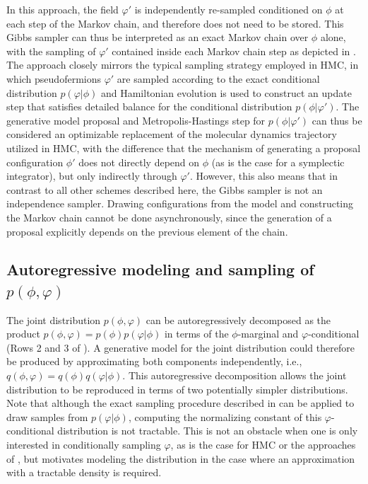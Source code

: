 \documentclass[aps,prd,twocolumn,nofootinbib,superscriptaddress,preprintnumbers]{revtex4-1}
\begin{document}
In this approach, the field $\varphi'$ is independently re-sampled conditioned on $\phi$ at each step of the Markov chain, and therefore does not need to be stored. This Gibbs sampler can thus be interpreted as an exact Markov chain over $\phi$ alone, with the sampling of $\varphi'$ contained inside each Markov chain step as depicted in . The approach closely mirrors the typical sampling strategy employed in HMC, in which pseudofermions $\varphi'$ are sampled according to the exact conditional distribution $p(\varphi|\phi)$ and Hamiltonian evolution is used to construct an update step that satisfies detailed balance for the conditional distribution $p(\phi|\varphi')$. The generative model proposal and Metropolis-Hastings step for $p(\phi|\varphi')$ can thus be considered an optimizable replacement of the molecular dynamics trajectory utilized in HMC, with the difference that the mechanism of generating a proposal configuration $\phi'$ does not directly depend on $\phi$ (as is the case for a symplectic integrator), but only indirectly through $\varphi'$. However, this also means that in contrast to all other schemes described here, the Gibbs sampler is not an independence sampler. Drawing configurations from the model and constructing the Markov chain cannot be done asynchronously, since the generation of a proposal explicitly depends on the previous element of the chain.


\subsection{Autoregressive modeling and sampling of \texorpdfstring{$p(\phi,\varphi)$}{p(phi,varphi)}}
\label{sec:autoregressive-sampling}

The joint distribution $p(\phi,\varphi)$ can be autoregressively decomposed as the product $p(\phi,\varphi) = p(\phi) p(\varphi|\phi)$ in terms of the $\phi$-marginal and $\varphi$-conditional (Rows 2 and 3 of ). A generative model for the joint distribution could therefore be produced by approximating both components independently, i.e., $q(\phi,\varphi) = q(\phi) q(\varphi|\phi)$. This autoregressive decomposition allows the joint distribution to be reproduced in terms of two potentially simpler distributions. Note that although the exact sampling procedure described in  can be applied to draw samples from $p(\varphi|\phi)$, computing the normalizing constant of this $\varphi$-conditional distribution is not tractable. This is not an obstacle when one is only interested in conditionally sampling $\varphi$, as is the case for HMC or the approaches of , but motivates modeling the distribution in the case where an approximation with a tractable density is required.
\end{document}
